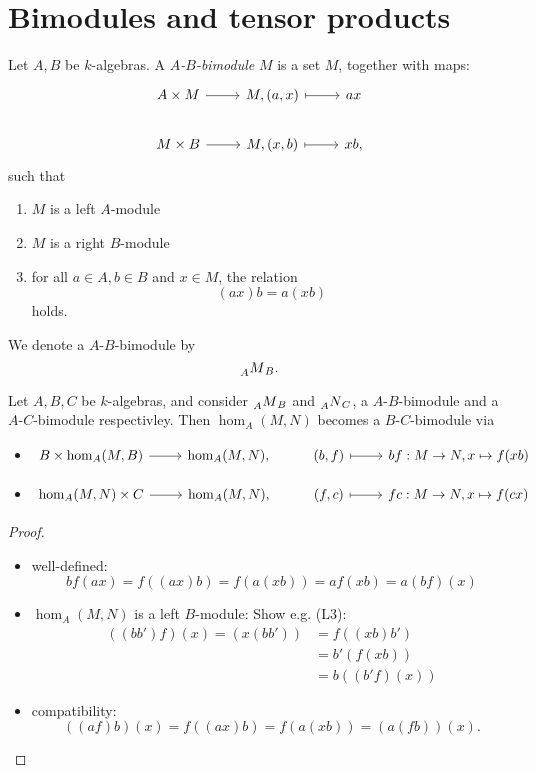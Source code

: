 \section{Bimodules and tensor products}
\begin{defn}
  Let $A,B$ be $k$-algebras. A \emph{$A$-$B$-bimodule} $M$ is a set $M$, together with maps:
  \[
  \begin{tikzcd}
    A\times M\ar{r}&M,(a,x)\ar[\mpt]{r}&ax\\
    M\times B\ar{r}&M,(x,b)\ar[\mpt]{r}&xb,
  \end{tikzcd}
  \]
  such that
  \begin{enumerate}
    \item $M$ is a left $A$-module
    \item $M$ is a right $B$-module
    \item for all $a\in A,b\in B$ and $x\in M$, the relation
    \[
    (ax)b=a(xb)
    \] holds.
\end{enumerate}
We denote a $A$-$B$-bimodule by
\[
\prescript{}{A}{M}_B.
\]
\end{defn}

\begin{lem}
  Let $A,B,C$ be $k$-algebras, and consider $\prescript{}{A}{M}_B$ and $\prescript{}{A}{N}_C$, a $A$-$B$-bimodule and a $A$-$C$-bimodule respectivley. Then $\hom_A(M,N)$ becomes a $B$-$C$-bimodule via
  \begin{itemize}
    \item $\begin{tikzcd}B\times \hom_A(M,B)\ar{r}&\hom_A(M,N),&(b,f)\ar[\mpt]{r}&bf:M\to N,x\mapsto f(xb)\end{tikzcd}$
    \item $\begin{tikzcd}\hom_A(M,N)\times C \ar{r}&\hom_A(M,N),&(f,c)\ar[\mpt]{r}&fc:M\to N,x\mapsto f(cx)\end{tikzcd}$
  \end{itemize}
\end{lem}
\begin{proof}
  \begin{itemize}
    \item well-defined:
    \[
    bf(ax)=f((ax)b)=f(a(xb))=af(xb)=a(bf)(x)
    \]
    \item $\hom_A(M,N)$ is a left $B$-module:
    Show e.g. (L3):
    \begin{align*}
    ((bb')f)(x)=(x(bb'))&=f((xb)b')\\
    &= b'(f(xb))\\
    &= b((b'f)(x))
    \end{align*}
    \item compatibility: \coms
      \[
      ((af)b)(x) = f((ax)b)=f(a(xb))=(a(fb))(x).
      \]
    \come
  \end{itemize}
\end{proof}

\lec
